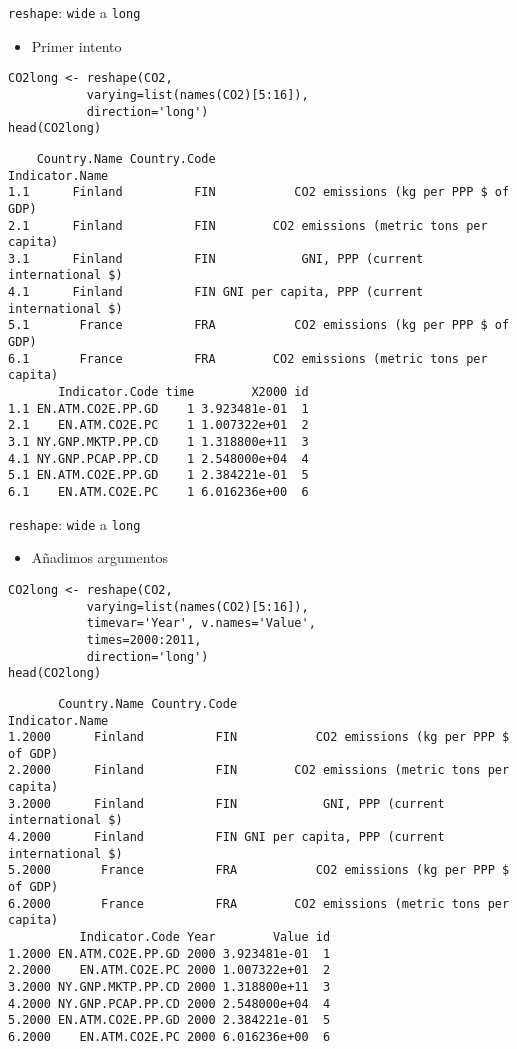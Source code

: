 \documentclass[xcolor={usenames,svgnames,dvipsnames}]{beamer}
\begin{document}
\begin{frame}[fragile,label=sec-4-3]{\texttt{reshape}: \texttt{wide} a \texttt{long}}
 \begin{itemize}
\item Primer intento
\end{itemize}
\lstset{language=R,numbers=none}
\begin{lstlisting}
CO2long <- reshape(CO2,
		   varying=list(names(CO2)[5:16]),
		   direction='long')
head(CO2long)
\end{lstlisting}

\begin{verbatim}
    Country.Name Country.Code                                Indicator.Name
1.1      Finland          FIN           CO2 emissions (kg per PPP $ of GDP)
2.1      Finland          FIN        CO2 emissions (metric tons per capita)
3.1      Finland          FIN            GNI, PPP (current international $)
4.1      Finland          FIN GNI per capita, PPP (current international $)
5.1       France          FRA           CO2 emissions (kg per PPP $ of GDP)
6.1       France          FRA        CO2 emissions (metric tons per capita)
       Indicator.Code time        X2000 id
1.1 EN.ATM.CO2E.PP.GD    1 3.923481e-01  1
2.1    EN.ATM.CO2E.PC    1 1.007322e+01  2
3.1 NY.GNP.MKTP.PP.CD    1 1.318800e+11  3
4.1 NY.GNP.PCAP.PP.CD    1 2.548000e+04  4
5.1 EN.ATM.CO2E.PP.GD    1 2.384221e-01  5
6.1    EN.ATM.CO2E.PC    1 6.016236e+00  6
\end{verbatim}
\end{frame}
\begin{frame}[fragile,label=sec-4-4]{\texttt{reshape}: \texttt{wide} a \texttt{long}}
 \begin{itemize}
\item Añadimos argumentos
\end{itemize}
\lstset{language=R,numbers=none}
\begin{lstlisting}
CO2long <- reshape(CO2,
		   varying=list(names(CO2)[5:16]),
		   timevar='Year', v.names='Value',
		   times=2000:2011,
		   direction='long')
head(CO2long)
\end{lstlisting}

\begin{verbatim}
       Country.Name Country.Code                                Indicator.Name
1.2000      Finland          FIN           CO2 emissions (kg per PPP $ of GDP)
2.2000      Finland          FIN        CO2 emissions (metric tons per capita)
3.2000      Finland          FIN            GNI, PPP (current international $)
4.2000      Finland          FIN GNI per capita, PPP (current international $)
5.2000       France          FRA           CO2 emissions (kg per PPP $ of GDP)
6.2000       France          FRA        CO2 emissions (metric tons per capita)
          Indicator.Code Year        Value id
1.2000 EN.ATM.CO2E.PP.GD 2000 3.923481e-01  1
2.2000    EN.ATM.CO2E.PC 2000 1.007322e+01  2
3.2000 NY.GNP.MKTP.PP.CD 2000 1.318800e+11  3
4.2000 NY.GNP.PCAP.PP.CD 2000 2.548000e+04  4
5.2000 EN.ATM.CO2E.PP.GD 2000 2.384221e-01  5
6.2000    EN.ATM.CO2E.PC 2000 6.016236e+00  6
\end{verbatim}
\end{frame}
\end{document}
